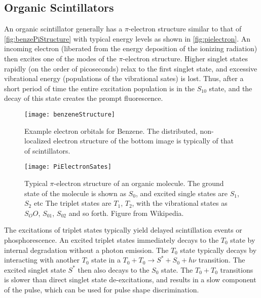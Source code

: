 \subsection{Organic Scintillators}
\label{sec:OrganicScinillators}
An organic scintillator generally has a $\pi$-electron structure similar to that of \autoref{fig:benzePiStructure} with typical energy levels as shown in \autoref{fig:pielectron}.
An incoming electron (liberated from the energy deposition of the ionizing radiation) then excites one of the modes of the $\pi$-electron structure.
Higher singlet states rapidly (on the order of picoseconds) relax to the first singlet state, and excessive vibrational energy (populations of the vibrational sates) is lost.
Thus, after a short period of time the entire excitation population is in the $S_10$ state, and the decay of this state creates the prompt fluorescence.
\begin{figure}
	\centering
	\texttt{[image: benzeneStructure]}
	\caption[Example orbitals for Benzene]{Example electron orbitals for Benzene.  The distributed, non-localized electron structure of the bottom image is typically of that of scintillators.}
	\label{fig:benzePiStructure}
\end{figure}
\begin{figure}
  \centering
  \texttt{[image: PiElectronSates]}
  \caption[$\pi$ Electron Structure]{Typical $\pi$-electron structure of an organic molecule. The ground state of the molecule is shown as $S_0$, and excited single states are $S_1$, $S_2$ etc The triplet states are $T_1$, $T_2$, with the vibrational states as $S_OO$, $S_01$, $S_02$ and so forth. Figure from Wikipedia.}
  \label{fig:pielectron}
\end{figure}
The excitations of triplet states typically yield delayed scintillation events or phosphorescence.
An excited triplet states immediately decays to the $T_0$ state by internal degradation without a photon emission.
The $T_0$ state typically decays by interacting with another $T_0$ state in a $T_0 + T_0 \to S^* + S_0 + h\nu$ transition.
The excited singlet state $S^*$ then also decays to the $S_0$ state.
The $T_0 + T_0$ transitions is slower than direct singlet state de-excitations, and results in a slow component of the pulse, which can be used for pulse shape discrimination.

